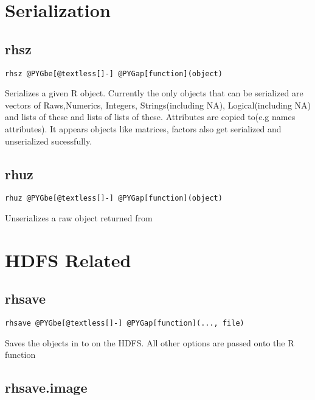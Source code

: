 \documentclass[letterpaper,10pt,english]{manual}
\begin{document}
\section{Serialization}


\subsection{rhsz}

\begin{Verbatim}[commandchars=@\[\]]
rhsz @PYGbe[@textless[]-] @PYGap[function](object)
\end{Verbatim}

Serializes a given R object. Currently the only objects that can be serialized
are vectors of Raws,Numerics, Integers, Strings(including NA), Logical(including NA)
and lists of these and lists of lists of these. Attributes are copied to(e.g
names attributes). It appears objects like matrices, factors also get serialized
and unserialized sucessfully.


\subsection{rhuz}

\begin{Verbatim}[commandchars=@\[\]]
rhuz @PYGbe[@textless[]-] @PYGap[function](object)
\end{Verbatim}

Unserializes a raw object returned from 


\section{HDFS Related}


\subsection{rhsave}

\begin{Verbatim}[commandchars=@\[\]]
rhsave @PYGbe[@textless[]-] @PYGap[function](..., file)
\end{Verbatim}

Saves the objects in  to  on the HDFS. All other options are
passed onto the R function 


\subsection{rhsave.image}
\end{document}
